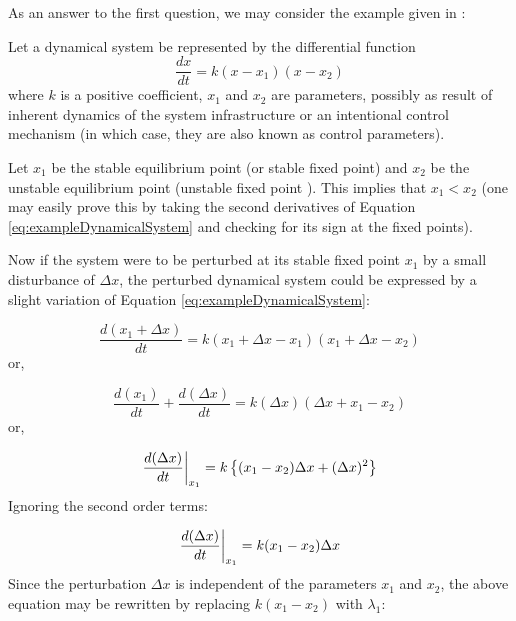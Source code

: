 As an answer to the first question, we may consider the example given in \cite{schefferEarlyWarningSignalsForCriticalTransitions}:

Let a dynamical system be represented by the differential function
\begin{equation}
	\label{eq:exampleDynamicalSystem}
	\frac{dx}{dt} = k(x-x_1)(x-x_2)
\end{equation}
\hspace{25pt} where $k$ is a positive coefficient, $x_1$ and $x_2$ are parameters, possibly as result of inherent dynamics of the system infrastructure or an intentional control mechanism (in which case, they are also known as control parameters).

Let $x_1$ be the stable equilibrium point (or stable fixed point) and $x_2$ be the unstable equilibrium point (unstable fixed point	). This implies that $x_1 < x_2$ (one may easily prove this by taking the second derivatives of Equation \ref{eq:exampleDynamicalSystem} and checking for its sign at the fixed points).

Now if the system were to be perturbed at its stable fixed point $x_1$ by a small disturbance of $\Delta x$, the perturbed dynamical system could be expressed by a slight variation of Equation \ref{eq:exampleDynamicalSystem}:

\begin{equation}
	\frac{d(x_1+\Delta x)}{dt} = k(x_1+\Delta x-x_1)(x_1+\Delta x - x_2)
\end{equation}
\hspace{25pt} or,

\begin{equation}
	\frac{d(x_1)}{dt} + \frac{d(\Delta x)}{dt} = k(\Delta x)(\Delta x + x_1 - x_2)
\end{equation}
\hspace{25pt} or,

\begin{equation}
	\evalat[\bigg]{\frac{d(\Delta x)}{dt}}{x_1} = k\left\{(x_1-x_2)\Delta x + (\Delta x)^2\right\}
\end{equation}
\hspace{25pt} Ignoring the second order terms:

\begin{equation}
	\evalat[\bigg]{\frac{d(\Delta x)}{dt}}{x_1} = k(x_1-x_2)\Delta x
\end{equation}
\hspace{25pt} Since the perturbation $\Delta x$ is independent of the parameters $x_1$ and $x_2$, the above equation may be rewritten by replacing $k(x_1-x_2)$ with $\lambda_1$:

